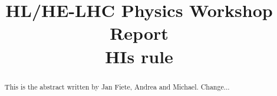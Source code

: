 \documentclass[11pt,twoside,a4paper]{cernrep}
\def\bibfiles{\main/bib/chapter,\main/section1/bib/section,\main/section2/bib/section}
\providecommand{\biblio}{\nocite{article-minimal}\clearpage}  %
\begin{document}
\newcommand{\main}{.}
\def\biblio{}

\title{HL/HE-LHC Physics Workshop Report \\[5mm]
  HIs rule}


\maketitle

\begin{abstract}
This is the abstract written by Jan Fiete, Andrea and Michael. Change...
\end{abstract}

\setcounter{tocdepth}{2}
\tableofcontents
\newpage


\newpage

\newpage




\end{document}
